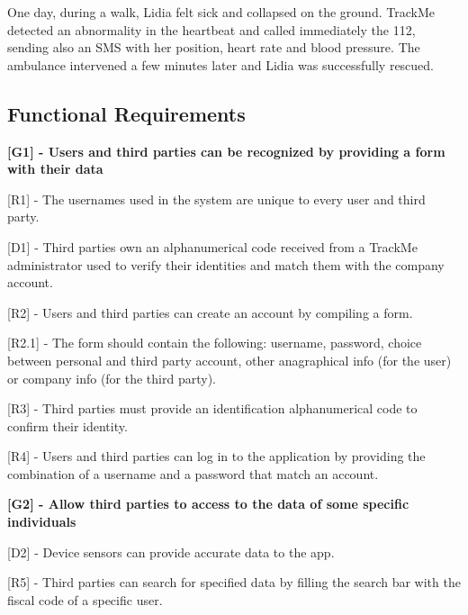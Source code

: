 One day, during a walk, Lidia felt sick and collapsed on the ground. TrackMe detected an abnormality in the heartbeat and called immediately the 112, sending also an SMS with her position, heart rate and blood pressure. The ambulance intervened a few minutes later and Lidia was successfully rescued.

\subsection{Functional Requirements}
\textbf{[G1] - Users and third parties can be recognized by providing a form with their data} \newline

[R1] -  The usernames used in the system are unique to every user and third party. \newline

[D1] - Third parties own an alphanumerical code received from a TrackMe administrator used to verify their identities and match them with the company account. \newline

[R2] - Users and third parties can create an account by compiling a form. \newline

\hspace{\parindent}[R2.1] - The form should contain the following: username, password, choice between personal and third party account, other anagraphical info (for the user) or company info (for the third party). \newline

[R3] - Third parties must provide an identification alphanumerical code to confirm their identity. \newline

[R4] - Users and third parties can log in to the application by providing the combination of a username and a password that match an account. \newline

\hspace{-\parindent}\textbf{[G2] - Allow third parties to access to the data of some specific individuals} \newline

[D2] - Device sensors can provide accurate data to the app. \newline

[R5] - Third parties can search for specified data by filling the search bar with the fiscal code of a specific user. \newline

